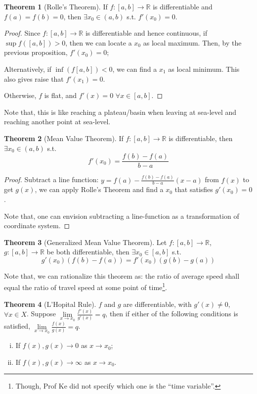 \documentclass[12pt]{article}
\newcommand{\R}{{\mathbb R}}
\theoremstyle{definition}
\newtheorem{theorem}{Theorem}[section]
\theoremstyle{plain}
\begin{document}
\begin{theorem}
    [Rolle's Theorem]
    If $f:[a,b] \to \R$ is differentiable and  $f(a) = f(b) = 0$, then $\exists 
    x_0 \in (a,b)$ s.t. $f'(x_0) = 0$.
    \begin{proof}
        Since $f: [a,b] \to \R$ is differentiable and hence continuous, if $\sup 
        f([a,b]) > 0$, then we can locate a $x_0$ as local maximum. 
        Then, by the previous proposition, $f'(x_0)=0$;

        Alternatively, if $ \inf(f[a,b]) < 0$, we can find a $x_1$ as local 
        minimum. This also gives raise that $f'(x_1) = 0$.

        Otherwise, $f$ is flat, and $f'(x) = 0$ $\forall x \in [a,b]$.
    \end{proof}

    Note that, this is like reaching a plateau/basin when leaving at sea-level 
    and reaching another point at sea-level.
\end{theorem}

\begin{theorem}
    [Mean Value Theorem]
    If $f: [a,b] \to \R$ is differentiable, then $\exists x _ 0 \in (a,b)$ s.t. 
    \[
        f'(x_0) = \frac{f(b) - f(a)}{b-a}
    \]
    \begin{proof}
        Subtract a line function: $y = f(a) - \frac{f(b) - f(a)}{ b-a } (x - a)$ 
        from $f(x)$ to get $g(x)$, we can apply Rolle's Theorem and find a $x_0$ 
        that satisfies $g'(x_0) = 0$.

        Note that, one can envision subtracting a line-function as a 
        transformation of coordinate system.
    \end{proof}
\end{theorem}

\begin{theorem}
    [Generalized Mean Value Theorem]
    Let $f: [a,b] \to \R$, $g:[a,b] \to \R$ be both differentiable, then 
    $\exists x_0 \in [a,b]$ s.t. 
    \[
        g'(x_0) (f(b) - f(a)) = f'(x_0) (g(b) - g(a))
    \]

    Note that, we can rationalize this theorem as: the ratio of average speed 
    shall equal the ratio of travel speed at some point of time\footnote{Though, 
    Prof Ke did not specify which one is the ``time variable''.}.
\end{theorem}

\begin{theorem}
    [L'Hopital Rule]
    $f$ and $g$ are differentiable, with $g'(x) \not = 0$, $\forall x \in X$. 
    Suppose $\underset{x \to x_0} \lim \frac{f'(x)}{g'(x)} = q$, then if either 
    of the following conditions is satisfied, $\underset{x \to x_0} \lim 
    \frac{f(x)}{g(x)} = q$.
    \begin{enumerate}[(i)]
        \item If $f(x), g(x) \to 0$ as $x \to x_0$;
        \item If $f(x), g(x) \to \infty$ as $x \to x_0$.
    \end{enumerate}
\end{theorem}
\end{document}
